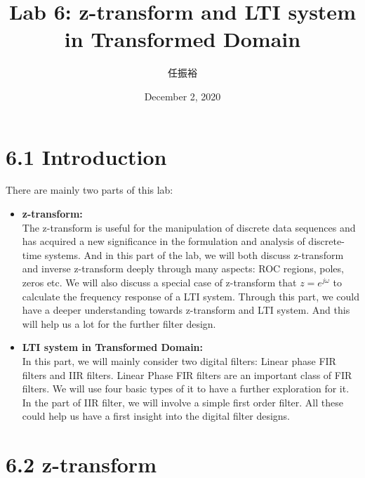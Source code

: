 \documentclass[onecolumn,oneside]{SUSTechHomework}
\begin{document}
\title{Lab 6: z-transform and LTI system in Transformed Domain}
\author{任振裕}
\date{December 2, 2020}
\maketitle 
\tableofcontents
\section*{6.1 Introduction}
There are mainly two parts of this lab: 
\begin{itemize}
    \item \textbf{z-transform:}\\
    The z-transform is useful for the manipulation of discrete data sequences and has 
    acquired a new significance in the formulation and analysis of discrete-time 
    systems. And in this part of the lab, we will both discuss z-transform and inverse 
    z-transform deeply through many aspects: ROC regions, poles, zeros etc. We will also discuss
    a special case of z-transform that $z=e^{j\omega}$ to calculate the frequency response of a LTI
    system. Through this part, we could have a deeper understanding towards z-transform and LTI system. And this
    will help us a lot for the further filter design.
    \item \textbf{LTI system in Transformed Domain:}\\
    In this part, we will mainly consider two digital filters: Linear phase FIR filters and IIR filters. Linear Phase FIR filters are an important class of FIR filters.
    We will use four basic types of it to have a further exploration for it. In the part of IIR filter, we will involve a simple first order filter.
    All these could help us have a first insight into the digital filter designs.
\end{itemize}
\section*{6.2 z-transform}
\end{document}
